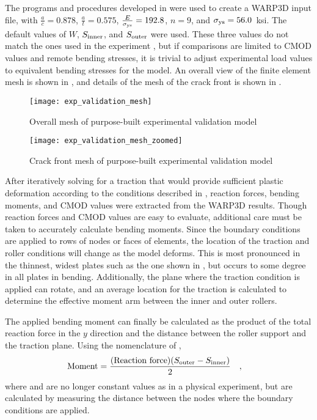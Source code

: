 The programs and procedures developed in  were used to create a WARP3D input file, with \(\frac{a}{c}=0.878\), \(\frac{a}{t}=0.575\), \(\frac{E}{\sigma_{\textnormal{ys}}}=192.8\), \(n=9\), and \(\sigma_{\textnormal{ys}}=56.0\)~ksi.
The default values of \(W\), \(S_\textnormal{inner}\), and \(S_\textnormal{outer}\) were used.
These three values do not match the ones used in the experiment \cite{allen2018}, but if comparisons are limited to CMOD values and remote bending stresses, it is trivial to adjust experimental load values to equivalent bending stresses for the model.
An overall view of the finite element mesh is shown in , and details of the mesh of the crack front is shown in .
\begin{figure}[tbp]
\centering
\texttt{[image: exp\_validation\_mesh]}
\caption{\label{fig:exp_validation_mesh} Overall mesh of purpose-built experimental validation model}
\end{figure}

\begin{figure}[tbp]
\centering
\texttt{[image: exp\_validation\_mesh\_zoomed]}
\caption{\label{fig:exp_validation_mesh_zoomed} Crack front mesh of purpose-built experimental validation model}
\end{figure}

After iteratively solving for a traction that would provide sufficient plastic deformation according to the conditions described in , reaction forces, bending moments, and CMOD values were extracted from the WARP3D results.
Though reaction forces and CMOD values are easy to evaluate, additional care must be taken to accurately calculate bending moments.
Since the boundary conditions are applied to rows of nodes or faces of elements, the location of the traction and roller conditions will change as the model deforms.
This is most pronounced in the thinnest, widest plates such as the one shown in , but occurs to some degree in all plates in bending.
Additionally, the plane where the traction condition is applied can rotate, and an average location for the traction is calculated to determine the effective moment arm between the inner and outer rollers.

The applied bending moment can finally be calculated as the product of the total reaction force in the $y$ direction and the distance between the roller support and the traction plane.
Using the nomenclature of ,
\begin{align}
\text{Moment} &= \frac{(\text{Reaction force})(S_\textnormal{outer} - S_\textnormal{inner})}{2}\quad,
\end{align}
where \Souter and \Sinner are no longer constant values as in a physical experiment, but are calculated by measuring the distance between the nodes where the boundary conditions are applied.

